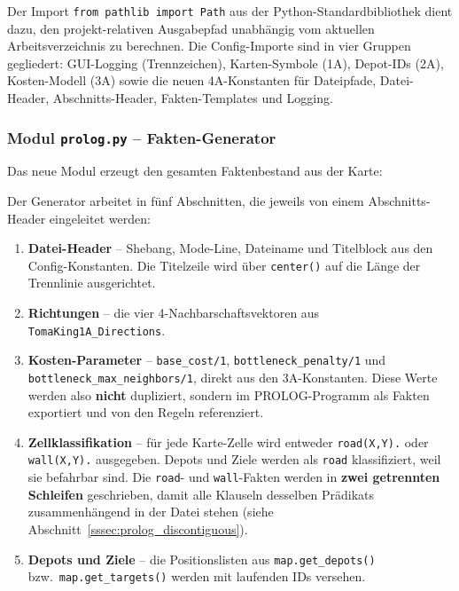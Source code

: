 

Der Import \texttt{from pathlib import Path} aus der Python-Standardbibliothek dient dazu, den projekt-relativen Ausgabepfad unabhängig vom aktuellen Arbeitsverzeichnis zu berechnen. Die Config-Importe sind in vier Gruppen gegliedert: GUI-Logging (Trennzeichen), Karten-Symbole (1A), Depot-IDs (2A), Kosten-Modell (3A) sowie die neuen 4A-Konstanten für Dateipfade, Datei-Header, Abschnitts-Header, Fakten-Templates und Logging.


\subsubsection{Modul \texttt{prolog.py} – Fakten-Generator}

Das neue Modul erzeugt den gesamten Faktenbestand aus der Karte:



Der Generator arbeitet in fünf Abschnitten, die jeweils von einem Abschnitts-Header eingeleitet werden:

\begin{enumerate}
    \item \textbf{Datei-Header} -- Shebang, Mode-Line, Dateiname und Titelblock aus den Config-Konstanten. Die Titelzeile wird über \texttt{center()} auf die Länge der Trennlinie ausgerichtet.
    \item \textbf{Richtungen} -- die vier 4-Nachbarschaftsvektoren aus \texttt{TomaKing1A\_Directions}.
    \item \textbf{Kosten-Parameter} -- \texttt{base\_cost/1}, \texttt{bottleneck\_penalty/1} und \\ \texttt{bottleneck\_max\_neighbors/1}, direkt aus den 3A-Konstanten. Diese Werte werden also \textbf{nicht} dupliziert, sondern im \acs{PROLOG}-Programm als Fakten exportiert und von den Regeln referenziert.
    \item \textbf{Zellklassifikation} -- für jede Karte-Zelle wird entweder \texttt{road(X,Y).} oder \texttt{wall(X,Y).} ausgegeben. Depots und Ziele werden als \texttt{road} klassifiziert, weil sie befahrbar sind. Die \texttt{road}- und \texttt{wall}-Fakten werden in \textbf{zwei getrennten Schleifen} geschrieben, damit alle Klauseln desselben Prädikats zusammenhängend in der Datei stehen (siehe Abschnitt~\ref{sssec:prolog_discontiguous}).
    \item \textbf{Depots und Ziele} -- die Positionslisten aus \texttt{map.get\_depots()} bzw.\ \texttt{map.get\_targets()} werden mit laufenden IDs versehen.
\end{enumerate}

